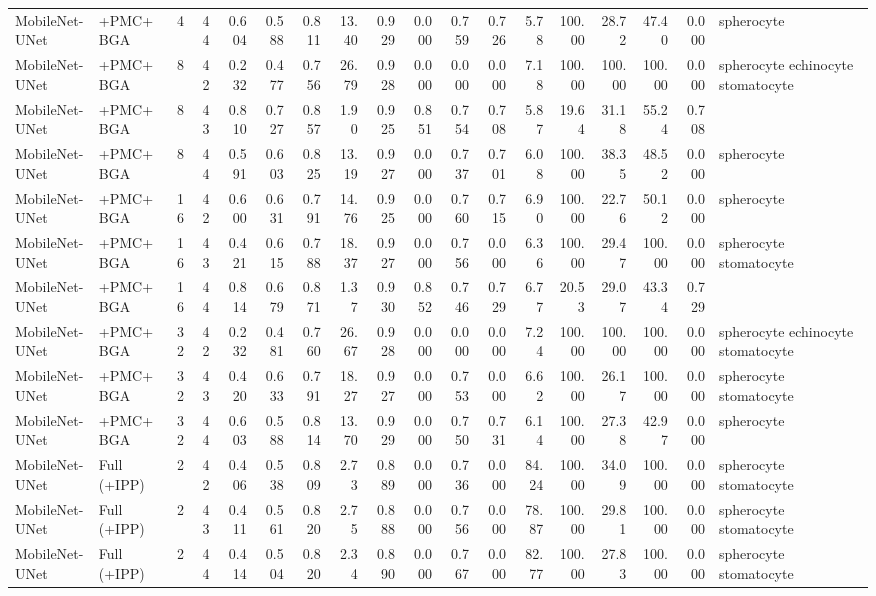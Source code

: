 \documentclass[10pt]{article}
\begin{document}
\begin{landscape}
{\begin{longtable}{l l r r r r r r r r r r r r r r r l}
MobileNet-UNet & +PMC+BGA & 4 & 44 & 0.604 & 0.588 & 0.811 & 13.40 & 0.929 & 0.000 & 0.759 & 0.726 & 5.78 & 100.00 & 28.72 & 47.40 & 0.000 & spherocyte \\
MobileNet-UNet & +PMC+BGA & 8 & 42 & 0.232 & 0.477 & 0.756 & 26.79 & 0.928 & 0.000 & 0.000 & 0.000 & 7.18 & 100.00 & 100.00 & 100.00 & 0.000 & spherocyte echinocyte stomatocyte \\
MobileNet-UNet & +PMC+BGA & 8 & 43 & 0.810 & 0.727 & 0.857 & 1.90 & 0.925 & 0.851 & 0.754 & 0.708 & 5.87 & 19.64 & 31.18 & 55.24 & 0.708 &  \\
MobileNet-UNet & +PMC+BGA & 8 & 44 & 0.591 & 0.603 & 0.825 & 13.19 & 0.927 & 0.000 & 0.737 & 0.701 & 6.08 & 100.00 & 38.35 & 48.52 & 0.000 & spherocyte \\
MobileNet-UNet & +PMC+BGA & 16 & 42 & 0.600 & 0.631 & 0.791 & 14.76 & 0.925 & 0.000 & 0.760 & 0.715 & 6.90 & 100.00 & 22.76 & 50.12 & 0.000 & spherocyte \\
MobileNet-UNet & +PMC+BGA & 16 & 43 & 0.421 & 0.615 & 0.788 & 18.37 & 0.927 & 0.000 & 0.756 & 0.000 & 6.36 & 100.00 & 29.47 & 100.00 & 0.000 & spherocyte stomatocyte \\
MobileNet-UNet & +PMC+BGA & 16 & 44 & 0.814 & 0.679 & 0.871 & 1.37 & 0.930 & 0.852 & 0.746 & 0.729 & 6.77 & 20.53 & 29.07 & 43.34 & 0.729 &  \\
MobileNet-UNet & +PMC+BGA & 32 & 42 & 0.232 & 0.481 & 0.760 & 26.67 & 0.928 & 0.000 & 0.000 & 0.000 & 7.24 & 100.00 & 100.00 & 100.00 & 0.000 & spherocyte echinocyte stomatocyte \\
MobileNet-UNet & +PMC+BGA & 32 & 43 & 0.420 & 0.633 & 0.791 & 18.27 & 0.927 & 0.000 & 0.753 & 0.000 & 6.62 & 100.00 & 26.17 & 100.00 & 0.000 & spherocyte stomatocyte \\
MobileNet-UNet & +PMC+BGA & 32 & 44 & 0.603 & 0.588 & 0.814 & 13.70 & 0.929 & 0.000 & 0.750 & 0.731 & 6.14 & 100.00 & 27.38 & 42.97 & 0.000 & spherocyte \\
MobileNet-UNet & Full (+IPP) & 2 & 42 & 0.406 & 0.538 & 0.809 & 2.73 & 0.889 & 0.000 & 0.736 & 0.000 & 84.24 & 100.00 & 34.09 & 100.00 & 0.000 & spherocyte stomatocyte \\
MobileNet-UNet & Full (+IPP) & 2 & 43 & 0.411 & 0.561 & 0.820 & 2.75 & 0.888 & 0.000 & 0.756 & 0.000 & 78.87 & 100.00 & 29.81 & 100.00 & 0.000 & spherocyte stomatocyte \\
MobileNet-UNet & Full (+IPP) & 2 & 44 & 0.414 & 0.504 & 0.820 & 2.34 & 0.890 & 0.000 & 0.767 & 0.000 & 82.77 & 100.00 & 27.83 & 100.00 & 0.000 & spherocyte stomatocyte \\

\end{longtable}}
\end{landscape}
\end{document}
